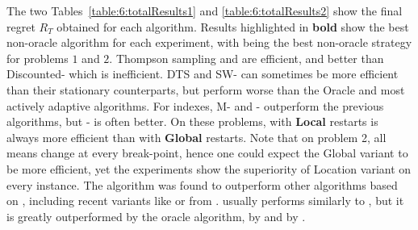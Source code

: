 
The two Tables~\ref{table:6:totalResults1} and \ref{table:6:totalResults2} show the final regret $R_T$ obtained for each algorithm.
Results highlighted in \textbf{bold} show the best non-oracle algorithm for each experiment,
with \GLRklUCB{} being the best non-oracle strategy for problems $1$ and $2$.
Thompson sampling and \klUCB{} are efficient,
and better than Discounted-\klUCB{} which is inefficient.
DTS and SW-\klUCB{} can sometimes be more efficient than their stationary counterparts, but perform worse than the Oracle and most actively adaptive algorithms.
%
For \klUCB{} indexes, M- and \CUSUM- outperform the previous algorithms, but \GLR- is often better.
%
On these problems, \GLRklUCB{} with \textbf{Local} restarts is always more efficient than with \textbf{Global} restarts. Note that on problem 2, all means change at every break-point, hence one could expect the Global variant to be more efficient, yet the experiments show the superiority of Location variant on every instance.
The \ExpThreeS{} algorithm was found to outperform other algorithms based on \ExpThree, including recent variants like \Exppp{} \cite{Seldin17} or \ExpThreeR{} from \cite{Allesiardo17}.
\ExpThreeS{} usually performs similarly to \MklUCB, but it is greatly outperformed by the oracle algorithm, by \GLRklUCB{} and by \CUSUMklUCB.


